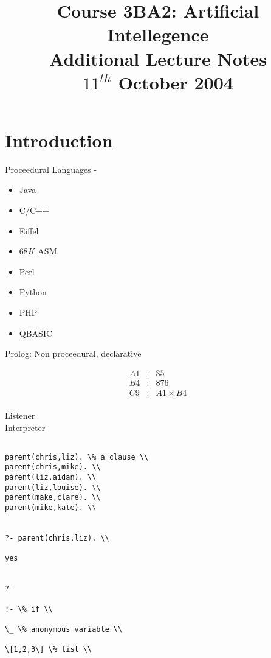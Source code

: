\documentclass[a4paper,12pt]{article}
\begin{document}
\title{Course 3BA2: Artificial Intellegence \\ Additional Lecture Notes \\ $11^{th}$ October 2004}

\maketitle

\section{Introduction}

Proceedural Languages - 

\begin{itemize}
\item Java
\item C/C++
\item Eiffel
\item $68K$ ASM
\item Perl
\item Python
\item PHP
\item QBASIC
\end{itemize}

Prolog: Non proceedural, declarative

\begin{eqnarray*}
A1 & : & 85 \\
B4 & : & 876 \\
C9 & : & A1 \times B4 \\
\end{eqnarray*}


Listener \\
Interpreter \\
 

\begin{verbatim}

parent(chris,liz). \% a clause \\
parent(chris,mike). \\
parent(liz,aidan). \\
parent(liz,louise). \\
parent(make,clare). \\
parent(mike,kate). \\


?- parent(chris,liz). \\

yes


?-

:- \% if \\

\_ \% anonymous variable \\

\[1,2,3\] \% list \\

\end{verbatim}
\end{document}
